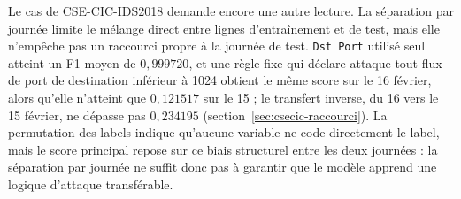 
Le cas de CSE-CIC-IDS2018 demande encore une autre lecture. La séparation par journée limite le mélange direct entre lignes d'entraînement et de test, mais elle n'empêche pas un raccourci propre à la journée de test. \texttt{Dst Port} utilisé seul atteint un F1 moyen de $0{,}999720$, et une règle fixe qui déclare attaque tout flux de port de destination inférieur à 1024 obtient le même score sur le 16 février, alors qu'elle n'atteint que $0{,}121517$ sur le 15 ; le transfert inverse, du 16 vers le 15 février, ne dépasse pas $0{,}234195$ (section~\ref{sec:csecic-raccourci}). La permutation des labels indique qu'aucune variable ne code directement le label, mais le score principal repose sur ce biais structurel entre les deux journées : la séparation par journée ne suffit donc pas à garantir que le modèle apprend une logique d'attaque transférable.
